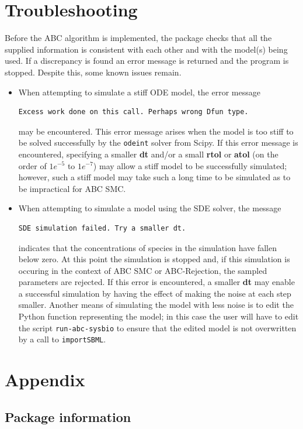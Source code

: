 \documentclass[a4paper]{report}
\begin{document}
\chapter{Troubleshooting} \label{Troubleshooting}
Before the ABC algorithm is implemented, the package checks that all the supplied information is consistent with each other and with the model(s) being used. If a discrepancy is found an error message is returned and the program is stopped. Despite this, some known issues remain.
\begin{itemize}
\item When attempting to simulate a stiff ODE model, the error message
\begin{verbatim}
Excess work done on this call. Perhaps wrong Dfun type.
\end{verbatim}
may be encountered. This error message arises when the model is too stiff to be solved successfully by the \verb$odeint$ solver from Scipy. If this error message is encountered, specifying a smaller \textbf{dt} and/or a small \textbf{rtol} or \textbf{atol} (on the order of $1e^{-5}$ to $1e^{-7}$) may allow a stiff model to be successfully simulated; however, such a stiff model may take such a long time to be simulated as to be impractical for ABC SMC.
\item When attempting to simulate a model using the SDE solver, the message
\begin{verbatim}
SDE simulation failed. Try a smaller dt.
\end{verbatim}
indicates that the concentrations of species in the simulation have fallen below zero. At this point the simulation is stopped and, if this simulation is occuring in the context of ABC SMC or ABC-Rejection, the sampled parameters are rejected. If this error is encountered, a smaller \textbf{dt} may enable a successful simulation by having the effect of making the noise at each step smaller. Another means of simulating the model with less noise is to edit the Python function representing the model; in this case the user will have to edit the script \verb$run-abc-sysbio$ to ensure that the edited model is not overwritten by a call to \verb$importSBML$.
\end{itemize}
\newpage
\chapter{Appendix}
\section{Package information}
\end{document}
